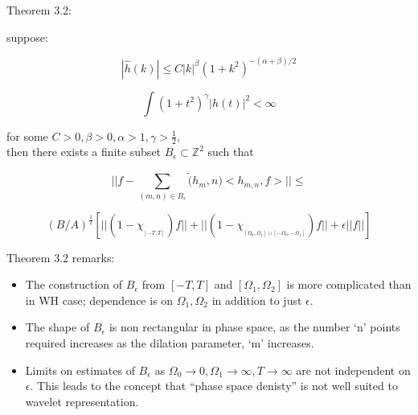 \documentclass{beamer}
\newcommand{\ints}[0] { \mathbb{Z}}
\newcommand{\eps}[0] {  \epsilon }
\newcommand{\cf}[1] { \chi_{_{#1}}  }
\begin{document}
\begin{frame}

Theorem 3.2: 

suppose:

\begin{equation*}
|\hat h (k) | \le C |k|^\beta (1 + k^2)^{-(\alpha + \beta)/2}
\end{equation*}

\begin{equation*}
\int (1+t^2)^\gamma |h(t)|^2 < \infty
\end{equation*}

for some $C>0, \beta>0, \alpha > 1, \gamma > \frac{1}{2}$, \\
then there exists a finite subset $B_\eps \subset \ints^2$ such that 


\begin{equation*}
||  f - \sum_{(m,n) \in B_\eps} \tilde(h_m,n)  <h_{m,n}, f > || \le 
\end{equation*}

\begin{equation*}
(B/A)^{\frac{1}{2}} \left[ ||(1-\cf{[-T,T]})  f|| + ||(1-\cf{[\Omega_0, \Omega_1] \cup [-\Omega_0, -\Omega_1]}) f|| + \eps ||f|| \right]
\end{equation*}


\end{frame}




\begin{frame}

Theorem 3.2 remarks:

\begin{itemize}
\item The construction of $B_\eps$ from $[-T,T]$ and $[\Omega_1,\Omega_2]$ is more complicated than in WH case; dependence is on $\Omega_1,\Omega_2$ in addition to just $\eps$. \\
\item The shape of $B_\eps$ is non rectangular in phase space, as the number `n' points required increases as the dilation parameter, `m' increases. \\
\item Limits on estimates of $B_\eps$ as $\Omega_0 \rightarrow 0, \Omega_1 \rightarrow \infty, T \rightarrow \infty$ are not independent on $\eps$. This leads to the concept that ``phase space denisty'' is not well suited to wavelet representation.\\
\end{itemize}


\end{frame}
\end{document}
